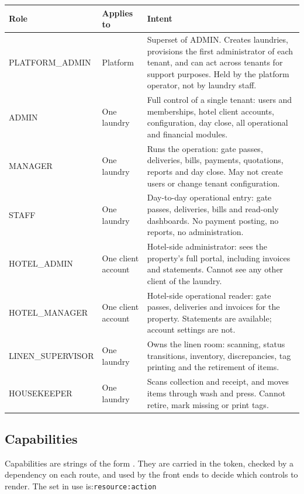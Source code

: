 \documentclass[11pt,a4paper,oneside]{book}
\begin{document}
\begin{center}\small
\begin{tabularx}{\linewidth}{|X|X|X|}
\hline
\rowcolor{lightgrey}
\textbf{Role} & \textbf{Applies to} & \textbf{Intent} \\ \hline
PLATFORM\_ADMIN & Platform & Superset of ADMIN. Creates laundries, provisions the first administrator of each tenant, and can act across tenants for support purposes. Held by the platform operator, not by laundry staff. \\ \hline
ADMIN & One laundry & Full control of a single tenant: users and memberships, hotel client accounts, configuration, day close, all operational and financial modules. \\ \hline
MANAGER & One laundry & Runs the operation: gate passes, deliveries, bills, payments, quotations, reports and day close. May not create users or change tenant configuration. \\ \hline
STAFF & One laundry & Day-to-day operational entry: gate passes, deliveries, bills and read-only dashboards. No payment posting, no reports, no administration. \\ \hline
HOTEL\_ADMIN & One client account & Hotel-side administrator: sees the property's full portal, including invoices and statements. Cannot see any other client of the laundry. \\ \hline
HOTEL\_MANAGER & One client account & Hotel-side operational reader: gate passes, deliveries and invoices for the property. Statements are available; account settings are not. \\ \hline
LINEN\_SUPERVISOR & One laundry & Owns the linen room: scanning, status transitions, inventory, discrepancies, tag printing and the retirement of items. \\ \hline
HOUSEKEEPER & One laundry & Scans collection and receipt, and moves items through wash and press. Cannot retire, mark missing or print tags. \\ \hline
\end{tabularx}
\end{center}
\subsection*{Capabilities}
Capabilities are strings of the form . They are carried in the token, checked by a dependency on each route, and used by the front ends to decide which controls to render. The set in use is:\texttt{resource:action}
\end{document}
